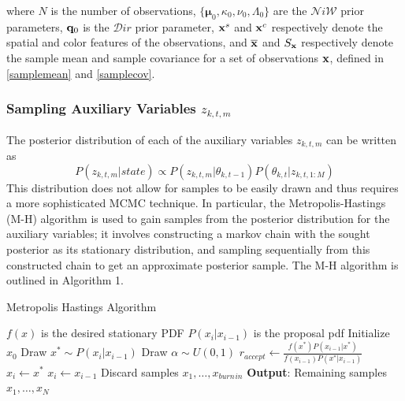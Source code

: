 \documentclass[smallcondensed, final]{svjour3}
\newcommand{\willie}[1]{\textcolor{green}{\textsf{\emph{\textbf{\textcolor{green}{#1}}}}}}
\begin{document}
where $N$ is the number of observations, $\{ \boldsymbol{\mu}_{0}, \kappa_{0}, \nu_{0}, \Lambda_{0} \}$ are the $\mathcal{N}i\mathcal{W}$ prior parameters, $\bold{q}_{0}$ is the $\mathcal{D}ir$ prior parameter, $\bold{x}^{s}$ and $\bold{x}^{c}$ respectively denote the spatial and color features of the observations, and $\overline{\bold{x}}$ and $S_{\bold{x}}$ respectively denote the sample mean and sample covariance for a set of observations $\bold{x}$, defined in \eqref{samplemean} and \eqref{samplecov}.





\subsubsection{Sampling Auxiliary Variables $z_{k,t,m}$}
The posterior distribution of each of the auxiliary variables $z_{k,t,m}$ can be written as
\begin{equation}
P(z_{k,t,m} | state) \propto  P(z_{k,t,m} | \theta_{k,t-1}) P(\theta_{k,t} | z_{k,t,1:M})
\end{equation}
This distribution does not allow for samples to be easily drawn and thus requires a more sophisticated MCMC technique. In particular, the Metropolis-Hastings (M-H) algorithm is used to gain samples from the posterior distribution for the auxiliary variables; it involves constructing a markov chain with the sought posterior as its stationary distribution, and sampling sequentially from this constructed chain to get an approximate posterior sample. The M-H algorithm is outlined in Algorithm 1.%

\begin{algorithm}[h!]
\label{alg:MH}
\caption{Metropolis Hastings Algorithm}
\begin{algorithmic}[1]
\STATE $f(x)$ is the desired stationary PDF
\STATE $P(x_{i} | x_{i-1})$ is the proposal pdf
\STATE Initialize $x_{0}$
\STATE Draw $x^{*} \sim P(x_{i} | x_{i-1})$
\STATE Draw $\alpha \sim U(0,1)$
\STATE $r_{accept} \leftarrow \frac{f(x^{*})P(x_{i-1} | x^{*})} {f(x_{i-1})P(x^{*} | x_{i-1})} $
\STATE $x_{i} \leftarrow x^{*}$
\ELSE
\STATE $x_{i} \leftarrow x_{i-1}$
\ENDIF
\ENDFOR
\STATE Discard samples $x_{1}, \ldots, x_{burn\hspace{1pt}in}$
\STATE \textbf{Output}: Remaining samples $x_{1}, \ldots, x_{N}$
\end{algorithmic}
\end{algorithm}
\end{document}
